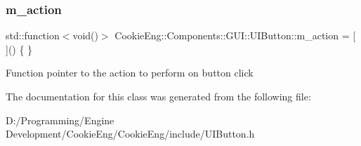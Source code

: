 \subsubsection{\texorpdfstring{m\+\_\+action}{m\_action}}
{\footnotesize\ttfamily std\+::function$<$void()$>$ Cookie\+Eng\+::\+Components\+::\+G\+U\+I\+::\+U\+I\+Button\+::m\+\_\+action = \mbox{[}$\,$\mbox{]}() \{ \}\hspace{0.3cm}{\ttfamily [protected]}}

Function pointer to the action to perform on button click 

The documentation for this class was generated from the following file\+:\begin{DoxyCompactItemize}
\item 
D\+:/\+Programming/\+Engine Development/\+Cookie\+Eng/\+Cookie\+Eng/include/U\+I\+Button.\+h\end{DoxyCompactItemize}
